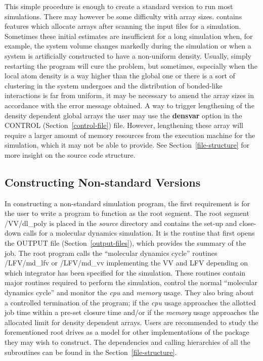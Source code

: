 This simple procedure is enough to create a standard version to run
most simulations.  There may however be some difficulty with array
sizes.  \D contains features which allocate arrays after scanning
the input files for a simulation.  Sometimes these initial estimates
are insufficient for a long simulation when, for example, the system
volume changes markedly during the simulation or when a system is
artificially constructed to have a non-uniform density. Usually,
simply restarting the program will cure the problem, but sometimes,
especially when the local atom density is a way higher than the
global one or there is a sort of clustering in the system undergoes
and the distribution of bonded-like interactions is far from uniform,
it may be necessary to amend the array sizes in accordance with the
error message obtained.  A way to trigger lengthening of the density
dependent global arrays the user may use the {\bf densvar} option in
the CONTROL (Section~\ref{control-file}) file.  However, lengthening
these array will require a larger amount of memory resources from the
execution machine for the simulation, which it may not be able to
provide.  See Section~\ref{file-structure} for more insight on the
\D source code structure.

\subsection{Constructing Non-standard Versions}

In constructing a non-standard \D simulation program, the first
requirement is for the user to write a program to function as the
root segment.  The root segment {\sc /VV/dl\_poly} is placed in the
{\em source} directory and contains the set-up and close-down calls
for a molecular dynamics simulation.  It is the routine that first
opens the OUTPUT file (Section~\ref{output-files}), which provides
the summary of the job.  The root program calls the ``molecular
dynamics cycle'' routines {\sc /LFV/md\_lfv} or {\sc /LFV/md\_vv}
implementing the VV and LFV depending on which integrator has been
specified for the simulation. These routines contain major routines
required to perform the simulation, control the normal ``molecular
dynamics cycle'' and monitor the {\em cpu} and {\em memory} usage.
They also bring about a controlled termination of the program; if
the {\em cpu} usage approaches the allotted job time within a
pre-set closure time and/or if the {\em memory} usage approaches the
allocated limit for density dependent arrays.   Users are
recommended to study the forementioned root drives as a model for
other implementations of the package they may wish to construct. The
dependencies and calling hierarchies of all the \D subroutines can
be found in the Section~\ref{file-structure}.

